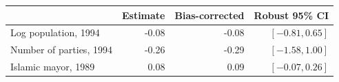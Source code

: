 \begin{center}
\small\renewcommand{\arraystretch}{1.3}
\begin{tabular}{@{}lrrr@{}}\toprule
 & Estimate & Bias-corrected & Robust 95\% CI\\\midrule
Log population, 1994 & -0.08 & -0.08 & $[-0.81, 0.65]$\\
Number of parties, 1994 & -0.26 & -0.29 & $[-1.58, 1.00]$\\
Islamic mayor, 1989 & 0.08 & 0.09 & $[-0.07, 0.26]$\\
\bottomrule\end{tabular}
\end{center}

